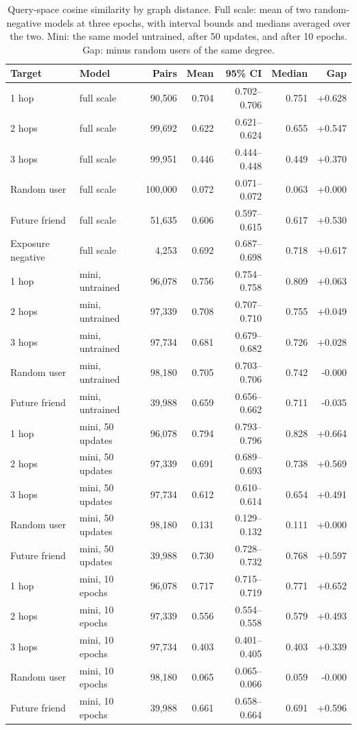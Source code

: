 \begin{table}[t]
  \caption{Query-space cosine similarity by graph distance. Full scale: mean of two random-negative models at three epochs, with interval bounds and medians averaged over the two. Mini: the same model untrained, after 50 updates, and after 10 epochs. Gap: minus random users of the same degree.}
  \label{tab:app-locality}
  \footnotesize\setlength{\tabcolsep}{4pt}
  \begin{tabular}{llrrrrr}
    \toprule
    Target & Model & Pairs & Mean & 95\% CI & Median & Gap \\
    \midrule
1 hop & full scale & 90{,}506 & 0.704 & 0.702--0.706 & 0.751 & +0.628 \\
2 hops & full scale & 99{,}692 & 0.622 & 0.621--0.624 & 0.655 & +0.547 \\
3 hops & full scale & 99{,}951 & 0.446 & 0.444--0.448 & 0.449 & +0.370 \\
Random user & full scale & 100{,}000 & 0.072 & 0.071--0.072 & 0.063 & +0.000 \\
Future friend & full scale & 51{,}635 & 0.606 & 0.597--0.615 & 0.617 & +0.530 \\
Exposure negative & full scale & 4{,}253 & 0.692 & 0.687--0.698 & 0.718 & +0.617 \\
1 hop & mini, untrained & 96{,}078 & 0.756 & 0.754--0.758 & 0.809 & +0.063 \\
2 hops & mini, untrained & 97{,}339 & 0.708 & 0.707--0.710 & 0.755 & +0.049 \\
3 hops & mini, untrained & 97{,}734 & 0.681 & 0.679--0.682 & 0.726 & +0.028 \\
Random user & mini, untrained & 98{,}180 & 0.705 & 0.703--0.706 & 0.742 & -0.000 \\
Future friend & mini, untrained & 39{,}988 & 0.659 & 0.656--0.662 & 0.711 & -0.035 \\
1 hop & mini, 50 updates & 96{,}078 & 0.794 & 0.793--0.796 & 0.828 & +0.664 \\
2 hops & mini, 50 updates & 97{,}339 & 0.691 & 0.689--0.693 & 0.738 & +0.569 \\
3 hops & mini, 50 updates & 97{,}734 & 0.612 & 0.610--0.614 & 0.654 & +0.491 \\
Random user & mini, 50 updates & 98{,}180 & 0.131 & 0.129--0.132 & 0.111 & +0.000 \\
Future friend & mini, 50 updates & 39{,}988 & 0.730 & 0.728--0.732 & 0.768 & +0.597 \\
1 hop & mini, 10 epochs & 96{,}078 & 0.717 & 0.715--0.719 & 0.771 & +0.652 \\
2 hops & mini, 10 epochs & 97{,}339 & 0.556 & 0.554--0.558 & 0.579 & +0.493 \\
3 hops & mini, 10 epochs & 97{,}734 & 0.403 & 0.401--0.405 & 0.403 & +0.339 \\
Random user & mini, 10 epochs & 98{,}180 & 0.065 & 0.065--0.066 & 0.059 & -0.000 \\
Future friend & mini, 10 epochs & 39{,}988 & 0.661 & 0.658--0.664 & 0.691 & +0.596 \\
    \bottomrule
  \end{tabular}
\end{table}
